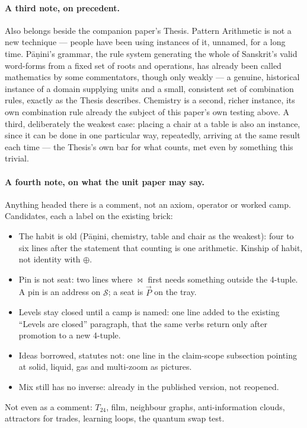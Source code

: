 \documentclass[12pt, a4paper]{article}
\begin{document}
\paragraph{A third note, on precedent.} Also belongs beside the
companion paper's Thesis. Pattern Arithmetic is not a new technique
--- people have been using instances of it, unnamed, for a long
time. P\={a}\d{n}ini's grammar, the rule system generating the whole
of Sanskrit's valid word-forms from a fixed set of roots and
operations, has already been called mathematics by some
commentators, though only weakly --- a genuine, historical instance
of a domain supplying units and a small, consistent set of
combination rules, exactly as the Thesis describes. Chemistry is a
second, richer instance, its own combination rule already the
subject of this paper's own testing above. A third, deliberately the
weakest case: placing a chair at a table is also an instance, since
it can be done in one particular way, repeatedly, arriving at the
same result each time --- the Thesis's own bar for what counts, met
even by something this trivial.


\paragraph{A fourth note, on what the unit paper may say.} Anything
headed there is a comment, not an axiom, operator or worked camp.
Candidates, each a label on the existing brick:
\begin{itemize}
\item The habit is old (P\={a}\d{n}ini, chemistry, table and chair
      as the weakest): four to six lines after the statement that
      counting is one arithmetic. Kinship of habit, not identity
      with $\oplus$.
\item Pin is not seat: two lines where $\bowtie$ first needs
      something outside the 4-tuple. A pin is an address on
      $\mathcal{S}$; a seat is $\vec P$ on the tray.
\item Levels stay closed until a camp is named: one line added to
      the existing ``Levels are closed'' paragraph, that the same
      verbs return only after promotion to a new 4-tuple.
\item Ideas borrowed, statutes not: one line in the claim-scope
      subsection pointing at solid, liquid, gas and multi-zoom as
      pictures.
\item Mix still has no inverse: already in the published version,
      not reopened.
\end{itemize}
Not even as a comment: $T_{24}$, film, neighbour graphs,
anti-information clouds, attractors for trades, learning loops, the
quantum swap test.
\end{document}
